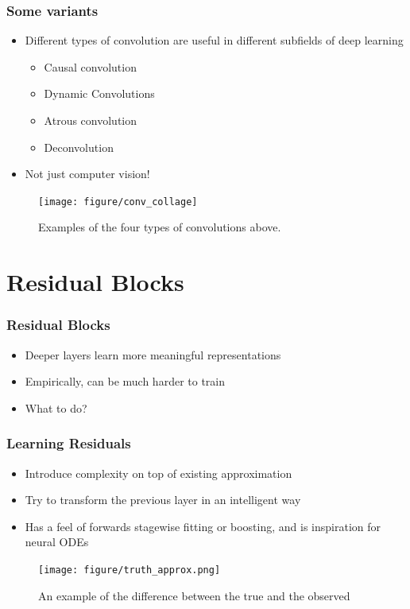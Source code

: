 \documentclass[10pt,mathserif]{beamer}
\begin{document}
\begin{frame}
  \frametitle{Some variants}
  \begin{itemize}
  \item Different types of convolution are useful in different subfields of deep
    learning
    \begin{itemize}
    \item Causal convolution \citep{van2016wavenet}
    \item Dynamic Convolutions \citep{kalchbrenner2014convolutional}
    \item Atrous convolution \citep{chen2018deeplab}
    \item Deconvolution \citep{ronneberger2015u}
    \end{itemize}
  \item Not just computer vision!
  \end{itemize}
  \begin{figure}[ht]
    \centering
    \texttt{[image: figure/conv\_collage]}
    \caption{Examples of the four types of convolutions above. \label{fig:conv_collage} }
  \end{figure}
\end{frame}

\section{Residual Blocks}
\label{sec:residual_layers}

\begin{frame}
  \frametitle{Residual Blocks}
  \begin{itemize}
  \item Deeper layers learn more meaningful representations
  \item Empirically, can be much harder to train
  \item What to do?
  \end{itemize}
\end{frame}

\begin{frame}
  \frametitle{Learning Residuals}
  \begin{itemize}
  \item Introduce complexity on top of existing approximation
  \item Try to transform the previous layer in an intelligent way
  \item Has a feel of forwards stagewise fitting or boosting, and is inspiration
    for neural ODEs \citep{chen2018neural}
  \end{itemize}
\begin{figure}[ht]
  \centering
  \texttt{[image: figure/truth\_approx.png]}
  \caption{An example of the difference between the true and the
    observed \label{fig:truth_approx} }
\end{figure}
\end{frame}
\end{document}
